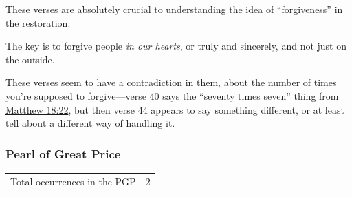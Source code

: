 \begin{compactdesc}
\begin{compactitem}
					\item These verses are absolutely crucial to understanding the idea of ``forgiveness'' in the restoration.
					\item The key is to forgive people \textit{in our hearts}, or truly and sincerely, and not just on the outside.
				\end{compactitem}
			\item[{\hyperref[DC76-34]{DC 76:34}}]
			\item[{\hyperref[DC82-1]{DC 82:1}}]
			\item[{\hyperref[DC84-61]{DC 84:61}}]
			\item[{\hyperref[DC95-1]{DC 95:1--3}}]
			\item[{\hyperref[DC98-39]{DC 98:39--48}}]
				\begin{compactitem}
					\item These verses seem to have a contradiction in them, about the number of times you're supposed to forgive---verse 40 says the ``seventy times seven'' thing from \hyperref[MATTHEW-18-22]{Matthew 18:22}, but then verse 44 appears to say something different, or at least tell about a different way of handling it.
				\end{compactitem}
			\item[{\hyperref[DC108-1]{DC 108:1}}]
			\item[{\hyperref[DC109-34]{DC 109:34}}]
			\item[{\hyperref[DC132-27]{DC 132:27}}]
		\end{compactdesc}
		
	\subsubsection{Pearl of Great Price} %
		\label{FORGIVENESS-PGP}
	
		\begin{tabular}{ll}
			Total occurrences in the PGP & 2
		\end{tabular}
		
		\begin{compactdesc}
			\item[{\hyperref[MOSES-6-53]{Moses 6:53}}]
		\end{compactdesc}
		

